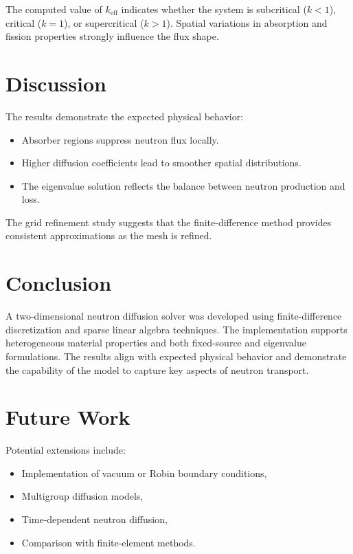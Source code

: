 \documentclass[11pt]{article}
\begin{document}
The computed value of $k_{\mathrm{eff}}$ indicates whether the system is subcritical ($k<1$), critical ($k=1$), or supercritical ($k>1$). Spatial variations in absorption and fission properties strongly influence the flux shape.

\section{Discussion}

The results demonstrate the expected physical behavior:
\begin{itemize}
    \item Absorber regions suppress neutron flux locally.
    \item Higher diffusion coefficients lead to smoother spatial distributions.
    \item The eigenvalue solution reflects the balance between neutron production and loss.
\end{itemize}

The grid refinement study suggests that the finite-difference method provides consistent approximations as the mesh is refined.

\section{Conclusion}

A two-dimensional neutron diffusion solver was developed using finite-difference discretization and sparse linear algebra techniques. The implementation supports heterogeneous material properties and both fixed-source and eigenvalue formulations. The results align with expected physical behavior and demonstrate the capability of the model to capture key aspects of neutron transport.

\section{Future Work}

Potential extensions include:
\begin{itemize}
    \item Implementation of vacuum or Robin boundary conditions,
    \item Multigroup diffusion models,
    \item Time-dependent neutron diffusion,
    \item Comparison with finite-element methods.
\end{itemize}
\end{document}
